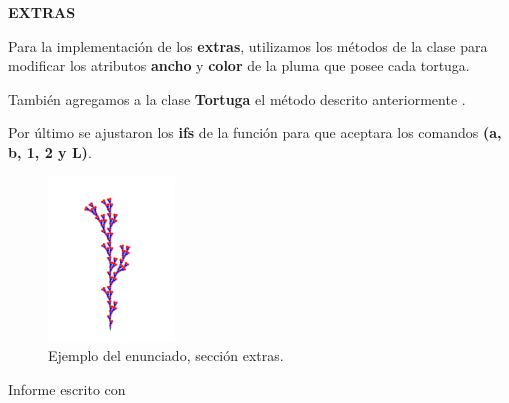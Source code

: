\documentclass{article}
\begin{document}
\newpage


 \begin{Huge}
	\begin{center}
		\textbf{EXTRAS \\[1cm]}
	\end{center}	 
\end{Huge}

\begin{description}
	\item Para la implementaci\'on de los  \textbf{extras}, utilizamos los m\'etodos de la clase  para modificar los atributos \textbf{ancho} y \textbf{color} de la pluma que posee cada tortuga. \\
	\item Tambi\'en agregamos a la clase \textbf{Tortuga} el m\'etodo  descrito anteriormente .\\
	\item Por \'ultimo se ajustaron los \textbf{ifs} de la funci\'on  para que aceptara los comandos  \textbf{(a, b, 1, 2 y L)}. \\[1cm]
\end{description}

\begin{figure}[hbt!]
	\center
	\includegraphics[width=0.3\textwidth]{img/ejemplo_extras.png}
	\caption{
	\label{fig:my-label} Ejemplo del enunciado, secci\'on extras. }
\end{figure}


\begin{flushright}
	Informe escrito con \Ovalbox{\bf \LaTeX}
\end{flushright}
\end{document}
